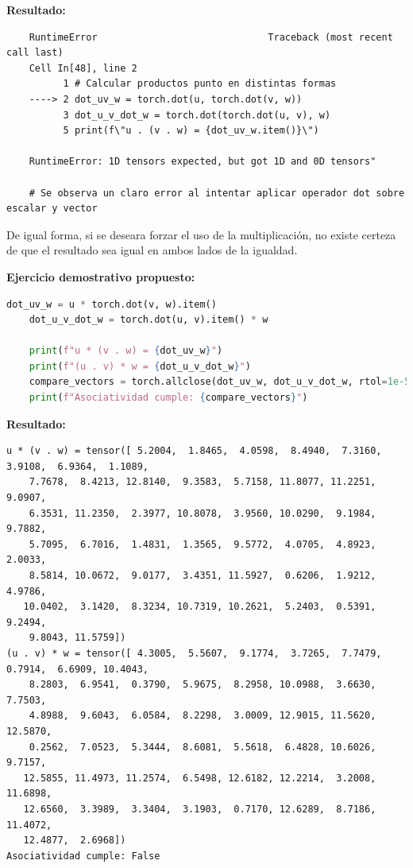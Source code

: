 \documentclass[12 pt]{article}
\begin{document}
\textbf{Resultado:}
\begin{lstlisting}
    RuntimeError                              Traceback (most recent call last)
    Cell In[48], line 2
          1 # Calcular productos punto en distintas formas
    ----> 2 dot_uv_w = torch.dot(u, torch.dot(v, w))
          3 dot_u_v_dot_w = torch.dot(torch.dot(u, v), w)
          5 print(f\"u . (v . w) = {dot_uv_w.item()}\")
    
    RuntimeError: 1D tensors expected, but got 1D and 0D tensors"

    # Se observa un claro error al intentar aplicar operador dot sobre escalar y vector
\end{lstlisting}

De igual forma, si se deseara forzar el uso de la multiplicación, no existe certeza de que el resultado sea igual en ambos lados de la igualdad.

\textbf{Ejercicio demostrativo propuesto:}
\begin{lstlisting}[language=Python]
    dot_uv_w = u * torch.dot(v, w).item()
    dot_u_v_dot_w = torch.dot(u, v).item() * w
    
    print(f"u * (v . w) = {dot_uv_w}")
    print(f"(u . v) * w = {dot_u_v_dot_w}")
    compare_vectors = torch.allclose(dot_uv_w, dot_u_v_dot_w, rtol=1e-5, atol=1e-8)
    print(f"Asociatividad cumple: {compare_vectors}")
\end{lstlisting}

\textbf{Resultado:}
\begin{lstlisting}
u * (v . w) = tensor([ 5.2004,  1.8465,  4.0598,  8.4940,  7.3160,  3.9108,  6.9364,  1.1089,
    7.7678,  8.4213, 12.8140,  9.3583,  5.7158, 11.8077, 11.2251,  9.0907,
    6.3531, 11.2350,  2.3977, 10.8078,  3.9560, 10.0290,  9.1984,  9.7882,
    5.7095,  6.7016,  1.4831,  1.3565,  9.5772,  4.0705,  4.8923,  2.0033,
    8.5814, 10.0672,  9.0177,  3.4351, 11.5927,  0.6206,  1.9212,  4.9786,
   10.0402,  3.1420,  8.3234, 10.7319, 10.2621,  5.2403,  0.5391,  9.2494,
    9.8043, 11.5759])
(u . v) * w = tensor([ 4.3005,  5.5607,  9.1774,  3.7265,  7.7479,  0.7914,  6.6909, 10.4043,
    8.2803,  6.9541,  0.3790,  5.9675,  8.2958, 10.0988,  3.6630,  7.7503,
    4.8988,  9.6043,  6.0584,  8.2298,  3.0009, 12.9015, 11.5620, 12.5870,
    0.2562,  7.0523,  5.3444,  8.6081,  5.5618,  6.4828, 10.6026,  9.7157,
   12.5855, 11.4973, 11.2574,  6.5498, 12.6182, 12.2214,  3.2008, 11.6898,
   12.6560,  3.3989,  3.3404,  3.1903,  0.7170, 12.6289,  8.7186, 11.4072,
   12.4877,  2.6968])
Asociatividad cumple: False
\end{lstlisting}
\end{document}
